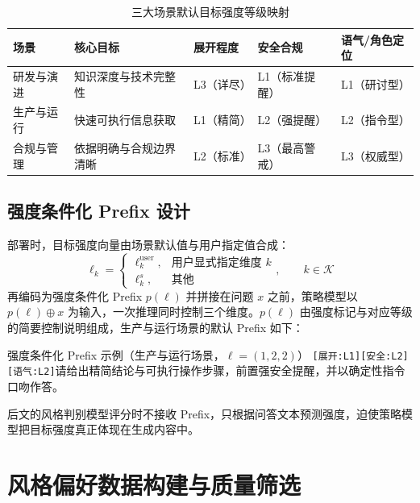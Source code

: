 \documentclass[fontset=fandol,type=master,campus=shenzhen,etitleauto=true]{hithesisbook}
\begin{document}
\begin{table}[htbp]
\centering
\caption{三大场景默认目标强度等级映射}
\label{tab:scene-intensity-map}
\small
\renewcommand{\arraystretch}{1.1}
\begin{tabular}{p{2.2cm}p{3.0cm}p{1.6cm}p{2.4cm}p{2.6cm}}
\toprule
\textbf{场景} & \textbf{核心目标} & \textbf{展开程度} & \textbf{安全合规} & \textbf{语气/角色定位} \\
\midrule
研发与演进 & 知识深度与技术完整性 & L3（详尽） & L1（标准提醒） & L1（研讨型） \\
生产与运行 & 快速可执行信息获取 & L1（精简） & L2（强提醒） & L2（指令型） \\
合规与管理 & 依据明确与合规边界清晰 & L2（标准） & L3（最高警戒） & L3（权威型） \\
\bottomrule
\end{tabular}
\end{table}

\subsection{强度条件化 Prefix 设计}\label{ux5f3aux5ea6ux6761ux4ef6ux5316-prefix-ux8bbeux8ba1}

部署时，目标强度向量由场景默认值与用户指定值合成：
\begin{equation}\label{eq:target-intensity}
\ell_k = \begin{cases} \ell_k^{\text{user}}, & \text{用户显式指定维度 } k \\ \ell_k^{s}, & \text{其他} \end{cases}, \qquad k \in \mathcal{K}
\end{equation}
再编码为强度条件化 Prefix $p(\boldsymbol{\ell})$ 并拼接在问题 $x$ 之前，策略模型以 $p(\boldsymbol{\ell}) \oplus x$ 为输入，一次推理同时控制三个维度。$p(\boldsymbol{\ell})$ 由强度标记与对应等级的简要控制说明组成，生产与运行场景的默认 Prefix 如下：

\begin{promptbox}{强度条件化 Prefix 示例（生产与运行场景，$\boldsymbol{\ell} = (1, 2, 2)$）}
\texttt{[展开:L1][安全:L2][语气:L2]}\quad 请给出精简结论与可执行操作步骤，前置强安全提醒，并以确定性指令口吻作答。
\end{promptbox}

后文的风格判别模型评分时不接收 Prefix，只根据问答文本预测强度，迫使策略模型把目标强度真正体现在生成内容中。

\section{风格偏好数据构建与质量筛选}\label{ux98ceux683cux504fux597dux6570ux636eux6784ux5efaux4e0e-llm-as-judge-ux7b5bux9009}
\end{document}
